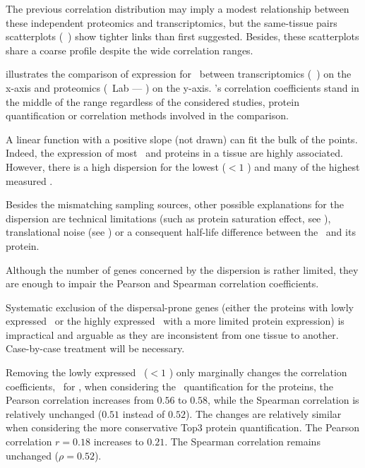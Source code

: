 The previous correlation distribution
may imply a modest relationship between
these independent proteomics and transcriptomics,
but the same-tissue pairs scatterplots (\eg\ )
show tighter links than first suggested.
Besides, these scatterplots share a coarse profile
despite the wide correlation ranges.\mybr\

 illustrates the comparison of expression for \kidney\
between transcriptomics (\uhlen\ \etal) on the x-axis
and proteomics (\pandey\ Lab --- \PPKM) on the y-axis.
\Kidney's correlation coefficients stand in the middle of the range
regardless of the considered studies,
protein quantification or correlation methods involved in the comparison.



A linear function with a positive slope (not drawn) can fit the bulk of the points.
Indeed, the expression of most \mRNAs\ and proteins in a tissue are highly associated.
However, there is a high dispersion for the lowest ($<1$ \FPKM)
and many of the highest measured \mRNAs{}.

Besides the mismatching sampling sources,
other possible explanations for the dispersion are
technical limitations (such as protein saturation effect, see ),
translational noise (see \Cref{subsubsec:exprTrans})
or a consequent half-life difference between the \mRNA\ and its protein.

Although the number of genes concerned by the dispersion is rather limited,
they are enough to impair the Pearson and Spearman correlation coefficients.\mybr\

Systematic exclusion of the dispersal-prone genes
(either the proteins with lowly expressed \mRNAs\
or the highly expressed \mRNAs\ with a more limited protein expression)
is impractical and arguable
as they are inconsistent from one tissue to another.\label{memo:dispersedGenes}
Case-by-case treatment will be necessary.

Removing the lowly expressed \mRNAs\ ($<1$ \FPKM) only marginally changes
the correlation coefficients,
\eg\ for \kidney,
when considering the \PPKM\ quantification for the proteins,
the Pearson correlation
increases from $0.56$ to $0.58$,
while the Spearman correlation is relatively unchanged
($0.51$ instead of $0.52$).
The changes are relatively similar
when considering the more conservative Top3 protein quantification.
The Pearson correlation $r=0.18$ increases to $0.21$.
The Spearman correlation remains unchanged ($\rho=0.52$).

